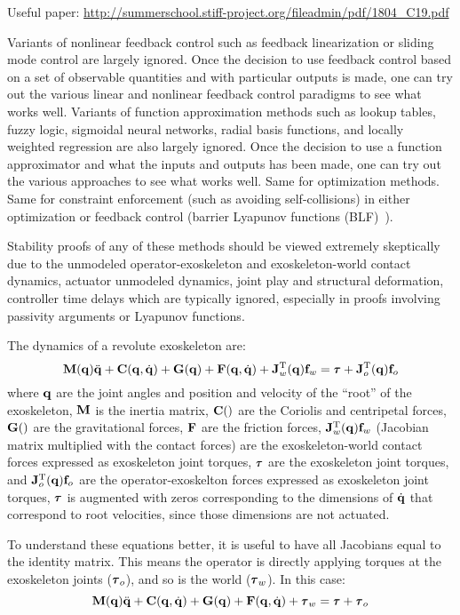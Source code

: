 \documentclass[letterpaper,12pt,fullpage]{article}
\begin{document}
Useful paper: \url{http://summerschool.stiff-project.org/fileadmin/pdf/1804_C19.pdf}

Variants of nonlinear feedback control such as feedback linearization or
sliding mode control are largely ignored. Once the decision to use feedback control
based on a set of observable quantities and with particular outputs is made,
one can try out the various linear and nonlinear feedback control paradigms
to see what works well.
Variants of function approximation methods such as lookup tables, fuzzy logic,
sigmoidal neural networks, radial basis functions, and locally weighted regression
are also largely ignored. Once the decision to use a function approximator
and what the inputs and outputs has been made, one can try out the various
approaches to see what works well.
Same for optimization methods.
Same for constraint enforcement (such as avoiding self-collisions)
in either optimization or feedback control (barrier
Lyapunov functions (BLF)~\cite{IEEE06911561}).

Stability proofs of any of these methods should be viewed extremely skeptically due
to the unmodeled operator-exoskeleton and exoskeleton-world contact dynamics, 
actuator unmodeled dynamics, joint play and structural deformation, controller
time delays which are typically ignored, especially in proofs involving
passivity arguments or Lyapunov functions.

The dynamics of a revolute exoskeleton are:
\begin{equation}
\mM(\vq) \ddot{\vq} + \mC(\vq,\dot{\vq}) + \mG(\vq) + \mF(\vq,\dot{\vq})
+ \mJ_w^{\tr}(\vq) \vf_w = \vtau + \mJ_o^{\tr}(\vq) \vf_o
\end{equation}
where ${\bf q}$ are the joint angles and position and velocity of the ``root'' of
the exoskeleton, ${\bf M}$ is the inertia matrix, ${\bf C}()$ are the Coriolis and
centripetal forces, ${\bf G}()$ are the gravitational forces, ${\bf F}$ are the
friction forces, ${\bf J}_w^{{\rm T}}({\bf q}) {\bf f}_w$ (Jacobian matrix multiplied with the
contact forces)
are the exoskeleton-world
contact forces 
expressed as exoskeleton joint torques, 
$\vtau$ are the exoskeleton
joint torques,
and ${\bf J}_o^{{\rm T}}({\bf q}) {\bf f}_o$
are the operator-exoskelton forces expressed
as exoskeleton joint torques,
$\vtau$ is augmented with zeros corresponding to the dimensions of $\dot{{\bf q}}$
that correspond to root velocities, since those dimensions are not actuated.

To understand these equations better, it is useful to have all Jacobians equal
to the identity matrix. This means the operator is directly applying torques
at the exoskeleton joints ($\vtau_o$), and so is the world ($\vtau_w$). In this case:
\begin{equation}
\mM(\vq) \ddot{\vq} + \mC(\vq,\dot{\vq}) + \mG(\vq) + \mF(\vq,\dot{\vq})
+ \vtau_w = \vtau + \vtau_o
\end{equation}
\end{document}
